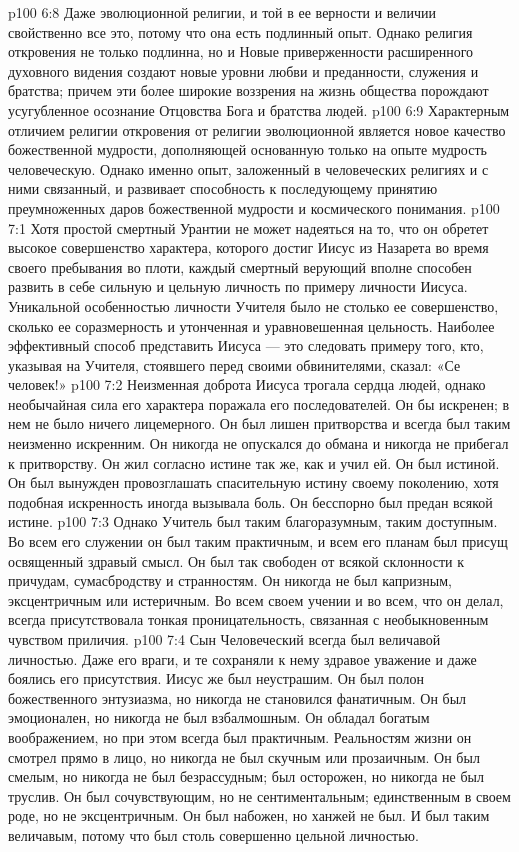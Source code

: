 \vs p100 6:8 \pc Даже эволюционной религии, и той в ее верности и величии свойственно все это, потому что она есть подлинный опыт. Однако религия откровения не только подлинна, но и  Новые приверженности расширенного духовного видения создают новые уровни любви и преданности, служения и братства; причем эти более широкие воззрения на жизнь общества порождают усугубленное осознание Отцовства Бога и братства людей.
\vs p100 6:9 Характерным отличием религии откровения от религии эволюционной является новое качество божественной мудрости, дополняющей основанную только на опыте мудрость человеческую. Однако именно опыт, заложенный в человеческих религиях и с ними связанный, и развивает способность к последующему принятию преумноженных даров божественной мудрости и космического понимания.
\vs p100 7:1 Хотя простой смертный Урантии не может надеяться на то, что он обретет высокое совершенство характера, которого достиг Иисус из Назарета во время своего пребывания во плоти, каждый смертный верующий вполне способен развить в себе сильную и цельную личность по примеру личности Иисуса. Уникальной особенностью личности Учителя было не столько ее совершенство, сколько ее соразмерность и утонченная и уравновешенная цельность. Наиболее эффективный способ представить Иисуса --- это следовать примеру того, кто, указывая на Учителя, стоявшего перед своими обвинителями, сказал: «Се человек!»
\vs p100 7:2 Неизменная доброта Иисуса трогала сердца людей, однако необычайная сила его характера поражала его последователей. Он бы искренен; в нем не было ничего лицемерного. Он был лишен притворства и всегда был таким неизменно искренним. Он никогда не опускался до обмана и никогда не прибегал к притворству. Он жил согласно истине так же, как и учил ей. Он был истиной. Он был вынужден провозглашать спасительную истину своему поколению, хотя подобная искренность иногда вызывала боль. Он бесспорно был предан всякой истине.
\vs p100 7:3 Однако Учитель был таким благоразумным, таким доступным. Во всем его служении он был таким практичным, и всем его планам был присущ освященный здравый смысл. Он был так свободен от всякой склонности к причудам, сумасбродству и странностям. Он никогда не был капризным, эксцентричным или истеричным. Во всем своем учении и во всем, что он делал, всегда присутствовала тонкая проницательность, связанная с необыкновенным чувством приличия.
\vs p100 7:4 Сын Человеческий всегда был величавой личностью. Даже его враги, и те сохраняли к нему здравое уважение и даже боялись его присутствия. Иисус же был неустрашим. Он был полон божественного энтузиазма, но никогда не становился фанатичным. Он был эмоционален, но никогда не был взбалмошным. Он обладал богатым воображением, но при этом всегда был практичным. Реальностям жизни он смотрел прямо в лицо, но никогда не был скучным или прозаичным. Он был смелым, но никогда не был безрассудным; был осторожен, но никогда не был труслив. Он был сочувствующим, но не сентиментальным; единственным в своем роде, но не эксцентричным. Он был набожен, но ханжей не был. И был таким величавым, потому что был столь совершенно цельной личностью.
